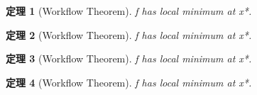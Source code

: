 \documentclass{article}
\newtheorem{theorem}{定理}
\begin{document}
\begin{theorem}[Workflow Theorem]
f has local minimum at x*.
\end{theorem}

\begin{theorem}[Workflow Theorem]
f has local minimum at x*.
\end{theorem}

\begin{theorem}[Workflow Theorem]
f has local minimum at x*.
\end{theorem}

\begin{theorem}[Workflow Theorem]
f has local minimum at x*.
\end{theorem}
\end{document}
